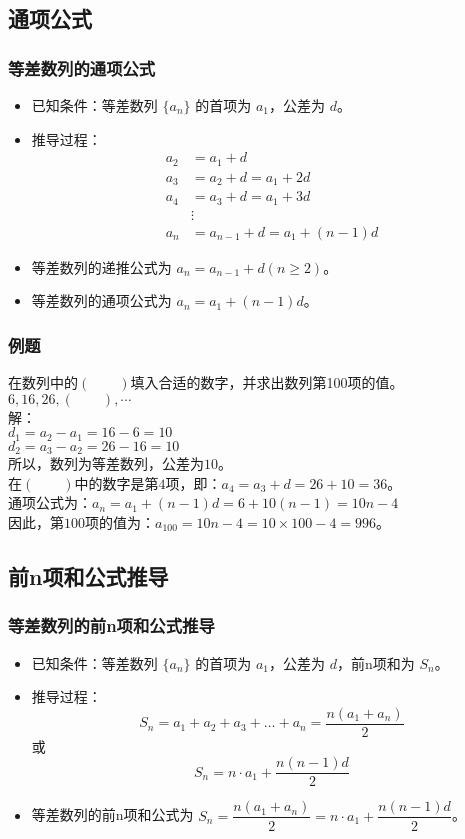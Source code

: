 \documentclass{ctexbeamer}
\begin{document}
\subsection{通项公式}
\begin{frame}[t]
\frametitle{等差数列的通项公式}
\begin{itemize}
    \item 已知条件：等差数列 $\{a_n\}$ 的首项为 $a_1$，公差为 $d$。
    \item 推导过程：
        \begin{align*}
            a_2 &= a_1 + d \\
            a_3 &= a_2 + d = a_1 + 2d \\
            a_4 &= a_3 + d = a_1 + 3d \\
            &\vdots \\
            a_n &= a_{n-1} + d = a_1 + (n - 1)d
        \end{align*}
    \item 等差数列的递推公式为 $a_n = a_{n-1} + d (n \geq 2) $。
    \item 等差数列的通项公式为 $a_n = a_1 + (n - 1)d$。
\end{itemize}
\end{frame}

\begin{frame}[t]
\frametitle{例题}
在数列中的$(\qquad)$填入合适的数字，并求出数列第100项的值。$6, 16, 26, (\qquad), \cdots$ \\
解：\\
$d_1 = a_2 - a_1 = 16 - 6 = 10$ \\
$d_2 = a_3 - a_2 = 26 - 16 = 10$ \\
所以，数列为等差数列，公差为$10$。\\
在$(\qquad)$中的数字是第$4$项，即：$a_4 = a_3 + d = 26 + 10 = 36$。\\
通项公式为：$a_n = a_1 + (n-1)d = 6 + 10(n-1) = 10n - 4$ \\
因此，第$100$项的值为：$a_{100} = 10n - 4 = 10 \times 100  - 4 = 996$。
\end{frame}

\subsection{前n项和公式推导}
\begin{frame}[t]
\frametitle{等差数列的前n项和公式推导}
\begin{itemize}
    \item 已知条件：等差数列 $\{a_n\}$ 的首项为 $a_1$，公差为 $d$，前n项和为 $S_n$。
    \item 推导过程：
        \[
            S_n = a_1 + a_2 + a_3 + \ldots + a_n = \frac{n(a_1 + a_n)}{2}
        \]
        或
        \[
            S_n = n \cdot a_1 + \dfrac{n(n - 1)d}{2}
        \]
    \item 等差数列的前n项和公式为 $S_n = \dfrac{n(a_1 + a_n)}{2} = n \cdot a_1 + \dfrac{n(n - 1)d}{2}$。
\end{itemize}
\end{frame}
\end{document}
